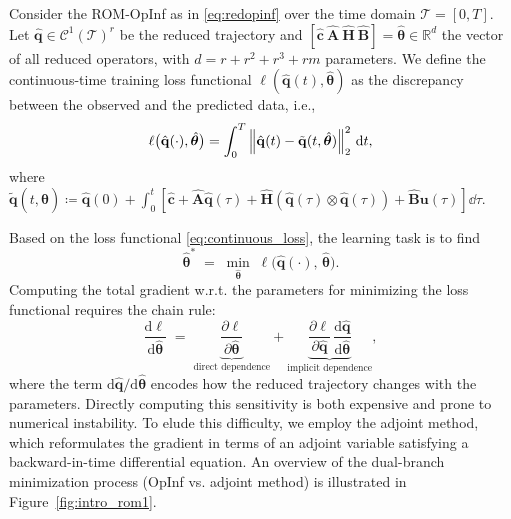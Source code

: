 \begin{definition} 
    \label{def:continuous_loss}
    Consider the ROM-OpInf as in \eqref{eq:redopinf} over the time domain $\mathcal{T}=[0,T]$. Let $\hat{\mathbf{q}}\in\mathcal{C}^1(\mathcal{T})^r$ be the reduced trajectory and $[\hat{\mathbf{c}}~\hat{\mathbf{A}}~\hat{\mathbf{H}}~\hat{\mathbf{B}}]=\hat{\bm{\theta}}\in\mathbb{R}^d$ the vector of all reduced operators, with $d=r+r^2+r^3+rm$ parameters. We define the continuous-time training loss functional $\ell(\hat{\mathbf{q}}(t),\hat{\bm{\theta}})$ as the discrepancy between the observed and the predicted data, i.e.,\\
    \begin{equation}
        \ell\bigl(\hat{\mathbf{q}}(\cdot),\hat{\bm{\theta}}\bigr) = \int_0^T \norm{\hat{\mathbf{q}}(t) - \tilde{\mathbf{q}}(t, \hat{\bm{\theta}})}_2^2~\dd t,
        \label{eq:continuous_loss}
    \end{equation}
    where $\tilde{\mathbf{q}}(t, \hat{\bm{\theta}}) \coloneqq \hat{\mathbf{q}}(0) + \displaystyle\int_{0}^t\left[ \hat{\mathbf{c}} + \hat{\mathbf{A}}\hat{\mathbf{q}}(\tau) + \hat{\mathbf{H}}\left(\hat{\mathbf{q}}(\tau)\otimes\hat{\mathbf{q}}(\tau) \right) +\hat{\mathbf{B}}\mathbf{u}(\tau) \right]\dd \tau $.

\end{definition}

Based on the loss functional \eqref{eq:continuous_loss}, the learning task is to find\\
\begin{equation}
  \hat{\bm{\theta}}^*
  \;=\;
  \min_{\hat{\bm{\theta}}}\;
  \ell\bigl(\hat{\mathbf{q}}(\cdot),\,\hat{\bm{\theta}}\bigr).
\end{equation}
Computing the total gradient w.r.t. the parameters for minimizing the loss functional requires the chain rule:\\
\begin{equation}
  \frac{\mathrm{d}\ell}{\mathrm{d}\hat{\bm{\theta}}}
  \;=\;
  \underbrace{\frac{\partial \ell}{\partial \hat{\bm{\theta}}}}_{\text{direct dependence}}
  +
  \underbrace{\frac{\partial \ell}{\partial \hat{\mathbf{q}}}\,
                \frac{\mathrm{d} \hat{\mathbf{q}}}{\mathrm{d} \hat{\bm{\theta}}}
               }_{\text{implicit dependence}},
    \label{eq:l_gradient}
\end{equation}
where the term $\mathrm{d} \hat{\mathbf{q}}/\mathrm{d} \hat{\bm{\theta}}$ encodes how the reduced trajectory changes with the parameters.  Directly computing this sensitivity is both expensive and prone to numerical instability.  To elude this difficulty, we employ the adjoint method, which reformulates the gradient in terms of an adjoint variable satisfying a backward-in-time differential equation. An overview of the dual-branch minimization process (OpInf vs. adjoint method) is illustrated in Figure~\ref{fig:intro_rom1}.

